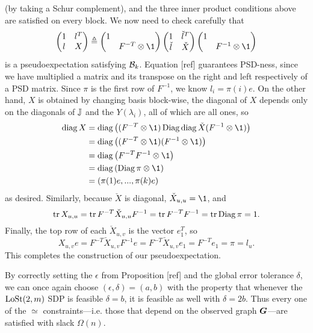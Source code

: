 \noindent (by taking a Schur complement), and the three inner product conditions above are satisfied on every block. We now need to check carefully that 
$$
    \begin{pmatrix} 1 & l^T \\ l & X \end{pmatrix}
    \triangleq \begin{pmatrix} 1 & \\ & F^{-T}\otimes \1 \end{pmatrix} \begin{pmatrix} 1 & \check l^T \\ \check l & \check X \end{pmatrix} \begin{pmatrix} 1 & \\ & F^{-1}\otimes \1 \end{pmatrix}
$$
is a pseudoexpectation satisfying $\mathcal{B}_k$. Equation [ref] guarantees PSD-ness, since we have multiplied a matrix and its transpose on the right and left respectively of a PSD matrix. Since $\pi$ is the first row of $F^{-1}$, we know $l_i = \pi(i)e$. On the other hand, $X$ is obtained by changing basis block-wise, the diagonal of $X$ depends only on the diagonals of $\mathbb{J}$ and the $Y(\lambda_i)$, all of which are all ones, so
\begin{align*}
    \diag X 
    &= \diag\big((F^{-T}\otimes \1)\Diag\diag \check X (F^{-1}\otimes \1)\big) \\
    &=\diag\big((F^{-T}\otimes \1) (F^{-1}\otimes \1)\big) \\
    &= \diag\left(F^{-T}F^{-1} \otimes \1\right) \\
    &= \diag\left(\Diag\pi \otimes \1\right) \\
    &= (\pi(1)e,...,\pi(k)e)
\end{align*}
as desired. Similarly, because $\check X$ is diagonal, $\check X_{u,u} = \1$, and
$$
    \operatorname{tr} X_{u,u} = \operatorname{tr} F^{-T}\check X_{u,u} F^{-1} = \operatorname{tr} F^{-T}F^{-1} = \operatorname{tr} \operatorname{Diag} \pi = 1.
$$
Finally, the top row of each $\check X_{u,v}$ is the vector $e_1^T$, so
$$
    X_{u,v}e = F^{-T}\check X_{u,v}F^{-1}e = F^{-T}\check X_{u,v}e_1 = F^{-T}e_1 = \pi = l_u.
$$
This completes the construction of our pseudoexpectation.

\begin{remark}
    By correctly setting the $\epsilon$ from Proposition [ref] and the global error tolerance $\delta$, we can once again choose $(\epsilon,\delta) = (a,b)$ with the property that whenever the $\operatorname{LoSt}(2,m)$ SDP is feasible $\delta = b$, it is feasible as well with $\delta = 2b$. Thus every one of the $\simeq$ constraints---i.e. those that depend on the observed graph $\boldsymbol{G}$---are satisfied with slack $\Omega(n)$.
\end{remark}

